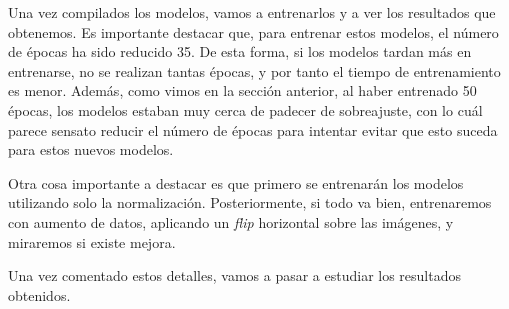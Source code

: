 \documentclass[11pt,a4paper]{article}
\begin{document}
Una vez compilados los modelos, vamos a entrenarlos y a ver los resultados que obtenemos. Es importante destacar que, para entrenar
estos modelos, el número de épocas ha sido reducido 35. De esta forma, si los modelos tardan más en entrenarse, no se realizan
tantas épocas, y por tanto el tiempo de entrenamiento es menor. Además, como vimos en la sección anterior, al haber entrenado 50
épocas, los modelos estaban muy cerca de padecer de sobreajuste, con lo cuál parece sensato reducir el número de épocas para
intentar evitar que esto suceda para estos nuevos modelos.

Otra cosa importante a destacar es que primero se entrenarán los modelos utilizando solo la normalización. Posteriormente,
si todo va bien, entrenaremos con aumento de datos, aplicando un \textit{flip} horizontal sobre las imágenes, y miraremos si
existe mejora.

Una vez comentado estos detalles, vamos a pasar a estudiar los resultados obtenidos.
\end{document}
